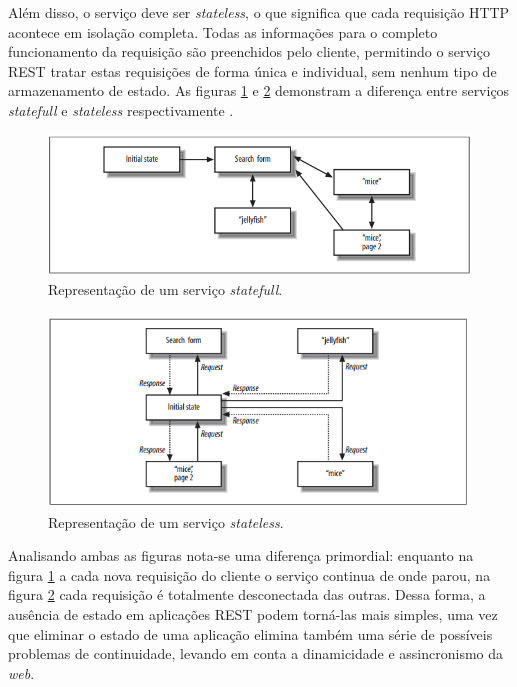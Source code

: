 \documentclass[12pt, openright, oneside, a4paper, brazil]{abntex2}
\begin{document}
Além disso, o serviço deve ser \textit{stateless}, o que significa que cada requisição HTTP acontece em isolação completa. Todas as informações para o completo funcionamento da requisição são preenchidos pelo cliente, permitindo o serviço REST tratar estas requisições de forma única e individual, sem nenhum tipo de armazenamento de estado. As figuras \ref{statefull} e \ref{stateless} demonstram a diferença entre serviços \textit{statefull} e \textit{stateless} respectivamente \cite{richardson2008restful}.

\begin{figure}[htp]
	\caption{\label{statefull}Representação de um serviço \textit{statefull}.}
	\begin{center}
		\includegraphics[scale=0.8]{images/statefull.png}
	\end{center}
\end{figure}

\begin{figure}[htp]
	\caption{\label{stateless}Representação de um serviço \textit{stateless}.}
	\begin{center}
		\includegraphics[scale=1]{images/stateless.png}
	\end{center}
\end{figure}

Analisando ambas as figuras nota-se uma diferença primordial: enquanto na figura \ref{statefull} a cada nova requisição do cliente o serviço continua de onde parou, na figura \ref{stateless} cada requisição é totalmente desconectada das outras. Dessa forma, a ausência de estado em aplicações REST podem torná-las mais simples, uma vez que eliminar o estado de uma aplicação elimina também uma série de possíveis problemas de continuidade, levando em conta a dinamicidade e assincronismo da \textit{web}.
\end{document}
